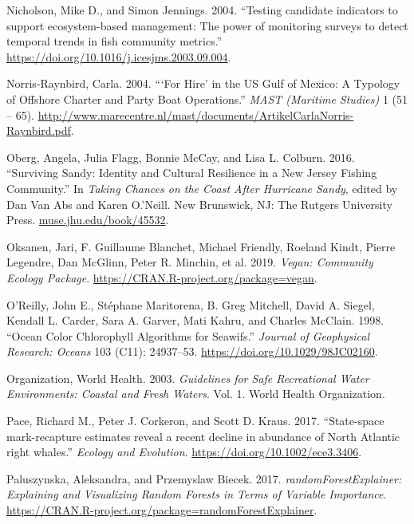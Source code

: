 \documentclass[
]{book}
\begin{document}
\leavevmode\hypertarget{ref-Nicholson2004}{}%
Nicholson, Mike D., and Simon Jennings. 2004. ``Testing candidate indicators to support ecosystem-based management: The power of monitoring surveys to detect temporal trends in fish community metrics.'' \url{https://doi.org/10.1016/j.icesjms.2003.09.004}.

\leavevmode\hypertarget{ref-norris-raynbird_for_2004}{}%
Norris-Raynbird, Carla. 2004. ```For Hire' in the US Gulf of Mexico: A Typology of Offshore Charter and Party Boat Operations.'' \emph{MAST (Maritime Studies)} 1 (51 -- 65). \url{http://www.marecentre.nl/mast/documents/ArtikelCarlaNorris-Raynbird.pdf}.

\leavevmode\hypertarget{ref-oberg_surviving_2016}{}%
Oberg, Angela, Julia Flagg, Bonnie McCay, and Lisa L. Colburn. 2016. ``Surviving Sandy: Identity and Cultural Resilience in a New Jersey Fishing Community.'' In \emph{Taking Chances on the Coast After Hurricane Sandy}, edited by Dan Van Abs and Karen O.'Neill. New Brunswick, NJ: The Rutgers University Press. \url{muse.jhu.edu/book/45532}.

\leavevmode\hypertarget{ref-R-vegan}{}%
Oksanen, Jari, F. Guillaume Blanchet, Michael Friendly, Roeland Kindt, Pierre Legendre, Dan McGlinn, Peter R. Minchin, et al. 2019. \emph{Vegan: Community Ecology Package}. \url{https://CRAN.R-project.org/package=vegan}.

\leavevmode\hypertarget{ref-SOE11}{}%
O'Reilly, John E., Stéphane Maritorena, B. Greg Mitchell, David A. Siegel, Kendall L. Carder, Sara A. Garver, Mati Kahru, and Charles McClain. 1998. ``Ocean Color Chlorophyll Algorithms for Seawifs.'' \emph{Journal of Geophysical Research: Oceans} 103 (C11): 24937--53. \url{https://doi.org/10.1029/98JC02160}.

\leavevmode\hypertarget{ref-WHO2003}{}%
Organization, World Health. 2003. \emph{Guidelines for Safe Recreational Water Environments: Coastal and Fresh Waters}. Vol. 1. World Health Organization.

\leavevmode\hypertarget{ref-Pace2017}{}%
Pace, Richard M., Peter J. Corkeron, and Scott D. Kraus. 2017. ``State-space mark-recapture estimates reveal a recent decline in abundance of North Atlantic right whales.'' \emph{Ecology and Evolution}. \url{https://doi.org/10.1002/ece3.3406}.

\leavevmode\hypertarget{ref-randomForestExplainer}{}%
Paluszynska, Aleksandra, and Przemyslaw Biecek. 2017. \emph{randomForestExplainer: Explaining and Visualizing Random Forests in Terms of Variable Importance}. \url{https://CRAN.R-project.org/package=randomForestExplainer}.
\end{document}
